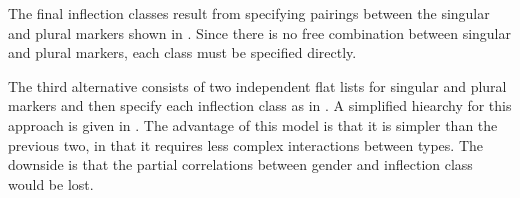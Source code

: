 \begin{figure}
{}
\end{figure}

The final inflection classes result from specifying pairings between the singular and plural markers shown in . Since there is no free combination between singular and plural markers, each class must be specified directly.

The third alternative consists of two independent flat lists for singular and plural markers and then specify each inflection class as in . A simplified hiearchy for this approach is given in . The advantage of this model is that it is simpler than the previous two, in that it requires less complex interactions between types. The downside is that the partial correlations between gender and inflection class would be lost.

